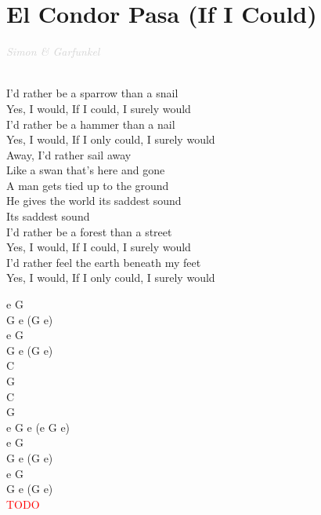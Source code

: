 \documentclass[a5paper, 10pt]{book}
\begin{document}
\section{El Condor Pasa (If I Could)}\textcolor{lightgray}{\textit{Simon \& Garfunkel}}\\~\\
\begin{minipage}[t]{0.8\textwidth}
I'd rather be a sparrow than a snail\\
Yes, I would, If I could, I surely would\\

I'd rather be a hammer than a nail\\
Yes, I would, If I only could, I surely would\\

\hspace*{5mm}Away, I'd rather sail away\\
\hspace*{5mm}Like a swan that's here and gone\\
\hspace*{5mm}A man gets tied up to the ground\\
\hspace*{5mm}He gives the world its saddest sound\\
\hspace*{5mm}Its saddest sound\\

I'd rather be a forest than a street\\
Yes, I would, If I could, I surely would\\

I'd rather feel the earth beneath my feet\\
Yes, I would, If I only could, I surely would\\
\end{minipage}
\begin{minipage}[t]{0.2\textwidth}
e G\\
G e (G e)\\

e G\\
G e (G e)\\

C\\
G\\
C\\
G\\
e G e (e G e)\\

e G\\
G e (G e)\\

e G\\
G e (G e)\\

\textcolor{red}{TODO}\\
\end{minipage}
\end{document}
